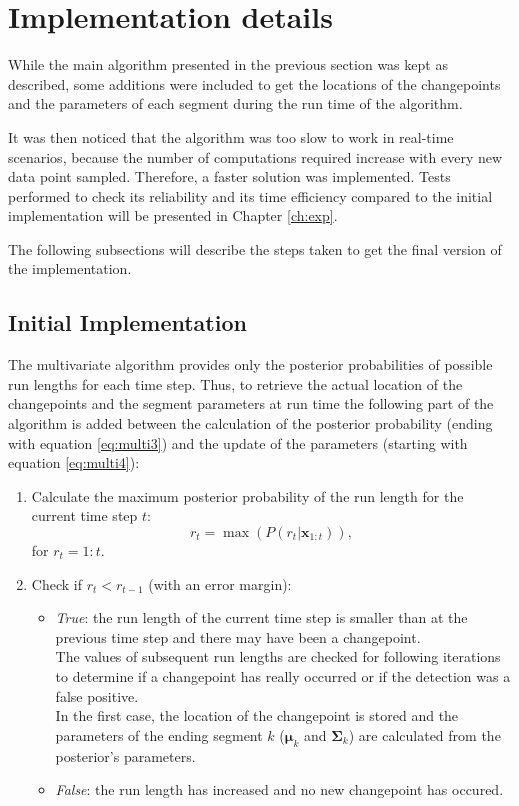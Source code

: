 \documentclass[11pt,twoside,a4paper]{report}
\begin{document}
\section{Implementation details} \label{sec:impl}

While the main algorithm presented in the previous section was kept as described, some additions were included to get the locations of the changepoints and the parameters of each segment during the run time of the algorithm.

It was then noticed that the algorithm was too slow to work in real-time scenarios, because the number of computations required increase with every new data point sampled. Therefore, a faster solution was implemented. Tests performed to check its reliability and its time efficiency compared to the initial implementation will be presented in Chapter \ref{ch:exp}.

The following subsections will describe the steps taken to get the final version of the implementation.

\subsection{Initial Implementation}

The multivariate algorithm provides only the posterior probabilities of possible run lengths for each time step. Thus, to retrieve the actual location of the changepoints and the segment parameters at run time the following part of the algorithm is added between the calculation of the posterior probability (ending with equation \ref{eq:multi3}) and the update of the parameters (starting with equation \ref{eq:multi4}):

\begin{enumerate}

\item Calculate the maximum posterior probability of the run length for the current time step $t$:
\begin{equation}
r_t = \max (P(r_t | \boldsymbol{x}_{1:t})),
\end{equation}
for $r_t = 1:t$.

\item Check if $r_t < r_{t-1}$ (with an error margin):
\begin{itemize}
\item \textit{True}: the run length of the current time step is smaller than at the previous time step and there may have been a changepoint. \\
The values of subsequent run lengths are checked for following iterations to determine if a changepoint has really occurred or if the detection was a false positive. \\ 
In the first case, the location of the changepoint is stored and the parameters of the ending segment $k$  ($\boldsymbol{\mu}_k$ and $\boldsymbol{\Sigma}_k$) are calculated from the posterior's parameters.
\item \textit{False}: the run length has increased and no new changepoint has occured.
\end{itemize}

\end{enumerate}
\end{document}

